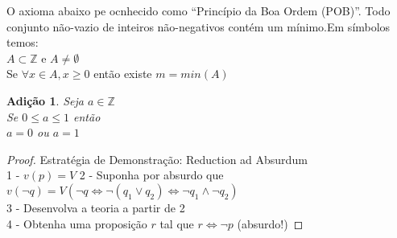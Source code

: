 \documentclass[a4paper,12pt]{article}
\newtheorem{add_int}{Adição}
\begin{document}
O axioma abaixo pe ocnhecido como ``Princípio da Boa Ordem (POB)''. Todo conjunto não-vazio de inteiros não-negativos contém um mínimo.Em símbolos temos:\\
$A \subset \mathbb{Z}$ e $A \neq \emptyset$\\
Se $\forall x \in A, x \ge 0$ então existe $m = min(A)$

\begin{add_int} %
  Seja $a \in \mathbb{Z}$\\
  Se $0 \leq a \leq 1$ então\\
  $a = 0$ ou $a = 1$
\end{add_int}
\begin{proof}
  Estratégia de Demonstração: Reduction ad Absurdum\\

  1 - $v(p) =V$
  2 - Suponha por absurdo que $v(\neg q) = V (\neg q \iff \neg (q_1 \vee q_2) \iff \neg q_1 \wedge \neg q_2)$\\
  3 - Desenvolva a teoria a partir de 2\\
  4 - Obtenha uma proposição $r$ tal que $r \iff \neg p$ (absurdo!)
\end{proof}
\end{document}
